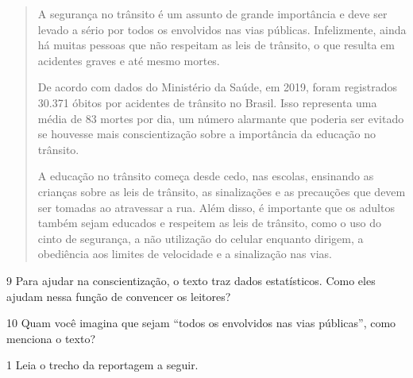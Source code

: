 \begin{quote}
A segurança no trânsito é um assunto de grande importância e deve ser
levado a sério por todos os envolvidos nas vias públicas. Infelizmente,
ainda há muitas pessoas que não respeitam as leis de trânsito, o que
resulta em acidentes graves e até mesmo mortes.


De acordo com dados do Ministério da Saúde, em 2019, foram registrados
30.371 óbitos por acidentes de trânsito no Brasil. Isso representa uma
média de 83 mortes por dia, um número alarmante que poderia ser evitado
se houvesse mais conscientização sobre a importância da educação no
trânsito.


A educação no trânsito começa desde cedo, nas escolas, ensinando as
crianças sobre as leis de trânsito, as sinalizações e as precauções que
devem ser tomadas ao atravessar a rua. Além disso, é importante que os
adultos também sejam educados e respeitem as leis de trânsito, como o
uso do cinto de segurança, a não utilização do celular enquanto dirigem,
a obediência aos limites de velocidade e a sinalização nas vias.

\end{quote}


\num{9} Para ajudar na conscientização, o texto traz dados estatísticos. Como
eles ajudam nessa função de convencer os leitores?



\num{10} Quam você imagina que sejam ``todos os envolvidos nas vias
públicas'', como menciona o texto?



\num{1} Leia o trecho da reportagem a seguir.

